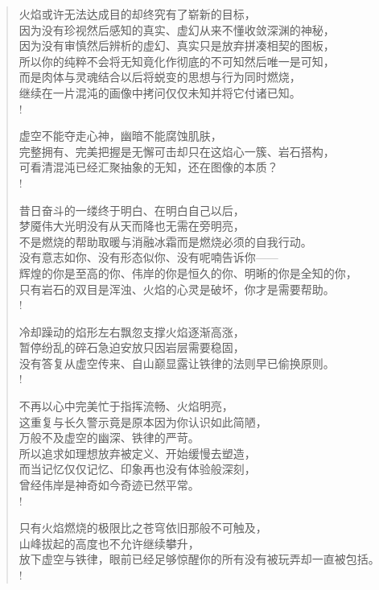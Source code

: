 \documentclass[UTF8, 12pt, a4paper]{ctexrep} %
\begin{document}
\begin{verse}
火焰或许无法达成目的却终究有了崭新的目标，\\
因为没有珍视然后感知的真实、虚幻从来不懂收敛深渊的神秘，\\
因为没有审慎然后辨析的虚幻、真实只是放弃拼凑相契的图板，\\
所以你的纯粹不会将无知竟化作彻底的不可知然后唯一是可知，\\
而是肉体与灵魂结合以后将蜕变的思想与行为同时燃烧，\\
继续在一片混沌的画像中拷问仅仅未知并将它付诸已知。\\!

虚空不能夺走心神，幽暗不能腐蚀肌肤，\\
完整拥有、完美把握是无懈可击却只在这焰心一簇、岩石搭构，\\
可看清混沌已经汇聚抽象的无知，还在图像的本质？\\!

昔日奋斗的一缕终于明白、在明白自己以后，\\
梦魇伟大光明没有从天而降也无需在旁明亮，\\
不是燃烧的帮助取暖与消融冰霜而是燃烧必须的自我行动。\\
没有意志如你、没有形态似你、没有呢喃告诉你——\\
辉煌的你是至高的你、伟岸的你是恒久的你、明晰的你是全知的你，\\
只有岩石的双目是浑浊、火焰的心灵是破坏，你才是需要帮助。\\!

冷却躁动的焰形左右飘忽支撑火焰逐渐高涨，\\
暂停纷乱的碎石急迫安放只因岩层需要稳固，\\
没有答复从虚空传来、自山巅显露让铁律的法则早已偷换原则。\\!

不再以心中完美忙于指挥流畅、火焰明亮，\\
这重复与长久警示竟是原本因为你认识如此简陋，\\
万般不及虚空的幽深、铁律的严苛。\\
所以追求如理想放弃被定义、开始缓慢去塑造，\\
而当记忆仅仅记忆、印象再也没有体验般深刻，\\
曾经伟岸是神奇如今奇迹已然平常。\\!

只有火焰燃烧的极限比之苍穹依旧那般不可触及，\\
山峰拔起的高度也不允许继续攀升，\\
放下虚空与铁律，眼前已经足够惊醒你的所有没有被玩弄却一直被包括。\\!


\end{verse}
\end{document}
